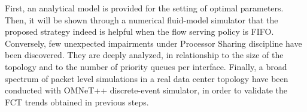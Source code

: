First, an analytical model is provided for the setting of optimal parameters. Then, it will be shown through a numerical fluid-model simulator that the proposed strategy indeed is helpful when the flow serving policy is FIFO. Conversely, few unexpected impairments under Processor Sharing discipline have been discovered. They are deeply analyzed, in relationship to the size of the topology and to the number of priority queues per interface. Finally, a broad spectrum of packet level simulations in a real data center topology have been conducted with OMNeT++ discrete-event simulator, in order to validate the FCT trends obtained in previous steps. 
